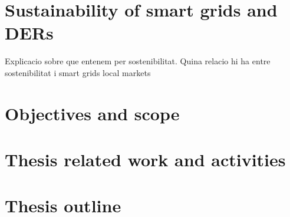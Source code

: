 \section{Sustainability of smart grids and DERs}
Explicacio sobre que entenem per sostenibilitat. Quina relacio hi ha entre sostenibilitat i smart grids local markets 

\newpage 
\section{Objectives and scope}
	
\newpage 
\section{Thesis related work and activities}
	

\newpage 
\section{Thesis outline}
	


